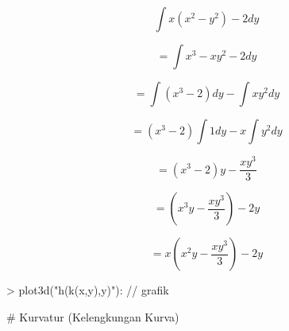 \documentclass[a4paper,10pt]{article}
\begin{document}
\begin{eulernotebook}
\begin{eulercomment}
\begin{eulercomment}
\begin{eulercomment}
\begin{eulercomment}
\begin{eulercomment}
\begin{eulercomment}
\begin{eulercomment}
\begin{eulercomment}
\begin{eulercomment}
\begin{eulercomment}
\begin{eulercomment}
\begin{eulercomment}
\begin{eulercomment}
\begin{eulercomment}
\begin{eulercomment}
\begin{eulercomment}
\begin{eulerformula}
\[
\int x(x^2-y^2) - 2 dy
\]
\end{eulerformula}
\begin{eulercomment}
\end{eulercomment}
\begin{eulerformula}
\[
= \int x^3 - xy^2 - 2 dy
\]
\end{eulerformula}
\begin{eulercomment}
\end{eulercomment}
\begin{eulerformula}
\[
= \int (x^3 - 2) dy - \int xy^2 dy
\]
\end{eulerformula}
\begin{eulercomment}
\end{eulercomment}
\begin{eulerformula}
\[
= (x^3 - 2) \int 1 dy - x \int y^2 dy
\]
\end{eulerformula}
\begin{eulercomment}
\end{eulercomment}
\begin{eulerformula}
\[
= (x^3 - 2)y - \frac {xy^3} {3}
\]
\end{eulerformula}
\begin{eulercomment}
\end{eulercomment}
\begin{eulerformula}
\[
= (x^3y - \frac {xy^3} {3}) - 2y
\]
\end{eulerformula}
\begin{eulercomment}
\end{eulercomment}
\begin{eulerformula}
\[
= x(x^2y - \frac {xy^3} {3}) - 2y
\]
\end{eulerformula}
\begin{eulerprompt}
> plot3d("h(k(x,y),y)"): // grafik
\end{eulerprompt}
\begin{eulercomment}
\end{eulercomment}
\begin{eulerttcomment}
  # Kurvatur (Kelengkungan Kurva)
\end{eulerttcomment}
\begin{eulercomment}
\end{eulercomment}
\begin{eulercomment}

\end{eulercomment}
\end{eulercomment}
\end{eulercomment}
\end{eulercomment}
\end{eulercomment}
\end{eulercomment}
\end{eulercomment}
\end{eulercomment}
\end{eulercomment}
\end{eulercomment}
\end{eulercomment}
\end{eulercomment}
\end{eulercomment}
\end{eulercomment}
\end{eulercomment}
\end{eulercomment}
\end{eulercomment}
\end{eulernotebook}
\end{document}
